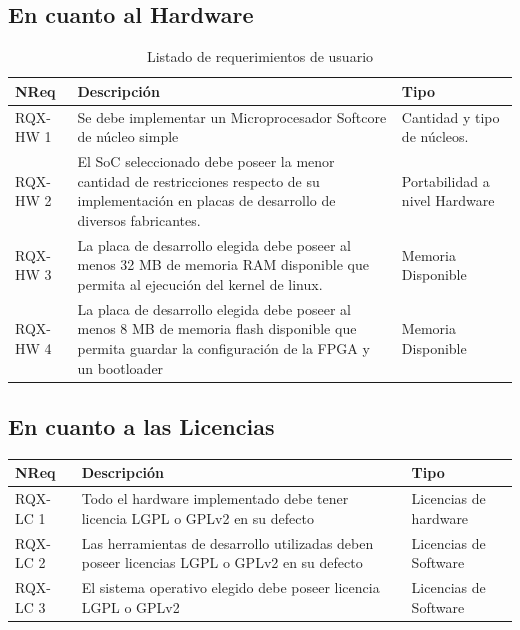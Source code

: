 		\subsection{En cuanto al Hardware}
		\begin{table}[h]
		\centering
		\begin{tabular}{ p{2.5cm} p{8cm} p{3cm} }
		\hline 
		\rowcolor[gray]{0.8} N\textordmasculine Req & Descripción & Tipo\\
		\hline
		RQX-HW 1 &  Se debe implementar un Microprocesador Softcore de núcleo simple & Cantidad y tipo de núcleos. \\
		\hline
		RQX-HW 2 &  El SoC seleccionado debe poseer la menor cantidad de restricciones respecto de su implementación en placas de desarrollo de diversos
		fabricantes. & Portabilidad a nivel Hardware\\
		\hline
		RQX-HW 3 & La placa de desarrollo elegida debe poseer al menos 32 MB de memoria RAM disponible que permita al ejecución del kernel de linux. &
		Memoria Disponible\\
		\hline
		RQX-HW 4 & La placa de desarrollo elegida debe poseer al menos 8 MB de memoria flash disponible que permita guardar la configuración de la FPGA y un
		bootloader & Memoria Disponible\\
		\hline
		\end{tabular}
		\caption{Listado de requerimientos de usuario}
		\label{tab:requsr}
		\end{table}
					
		\subsection{En cuanto a las Licencias}
		\begin{tabular}{ p{2.5cm} p{8cm} p{3cm} }
		\hline 
		\rowcolor[gray]{0.8} N\textordmasculine Req & Descripción  & Tipo\\
		\hline 
		RQX-LC 1 &  Todo el hardware implementado debe tener licencia LGPL o GPLv2 en su defecto & Licencias de hardware\\
		\hline 
		RQX-LC 2 &  Las herramientas de desarrollo utilizadas deben poseer licencias LGPL o GPLv2 en su defecto & Licencias de Software\\
		\hline
		RQX-LC 3 & El sistema operativo elegido debe poseer licencia LGPL o GPLv2 & Licencias de Software\\
		\hline
		\end{tabular}
			
